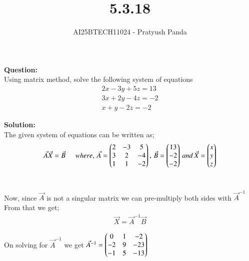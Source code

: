 \documentclass[journal]{IEEEtran}
\begin{document}

\vspace{3cm}

\title{5.3.18}
\author{AI25BTECH11024 - Pratyush Panda
}
\maketitle
{\let\newpage\relax\maketitle}

\renewcommand{\thefigure}{\theenumi}
\renewcommand{\thetable}{\theenumi}
\setlength{\intextsep}{10pt} %


\renewcommand{\thetable}{\theenumi}

\textbf{Question: } \\
Using matrix method, solve the following system of equations
\begin{align}
2x - 3y + 5z = 13 \\
3x + 2y - 4z = -2 \\
x + y - 2z = -2
\end{align}
\vspace{0.7cm}

\textbf{Solution: } \\
The given system of equations can be written as;
\begin{align}
\Vec{A}\Vec{X}=\Vec{B} \hspace{0.5cm} where, \, \Vec{A}=\begin{pmatrix}2 & -3 & 5 \\ 3 & 2 & -4 \\ 1 & 1 & -2\end{pmatrix}, \, \Vec{B}=\begin{pmatrix}13 \\ -2 \\ -2\end{pmatrix} \, and \, \Vec{X}=\begin{pmatrix}x \\ y \\ z\end{pmatrix}
\end{align}\

Now, since $\Vec{A}$ is not a singular matrix we can pre-multiply both sides with $\Vec{A}^{-1}$\\
From that we get;
\begin{align}
\Vec{X}=\Vec{A}^{-1}\Vec{B}
\end{align}

On solving for $\Vec{A}^{-1}$ we get $\Vec{A}^{-1}=\begin{pmatrix}0 & 1 & -2 \\ -2 & 9 & -23 \\ -1 & 5 & -13\end{pmatrix}$ \\
\end{document}
